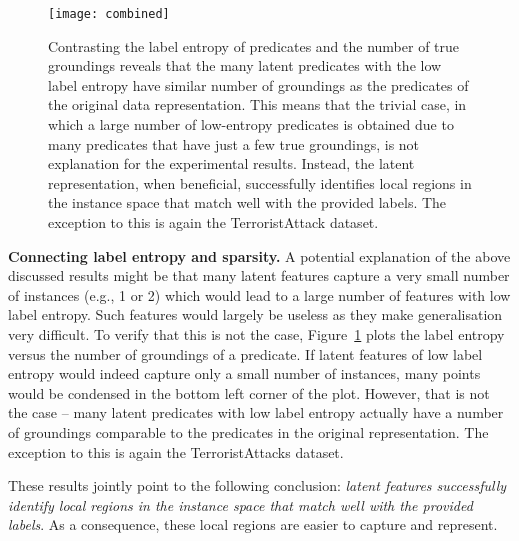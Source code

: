 \begin{figure}
	\centering
	\medskip
    \texttt{[image: combined]}
    \caption[Contrasting the label entropy and sparsity in latent representation created by \gls{curled}]{Contrasting the label entropy of predicates and the number of true groundings reveals that the many latent predicates with the low label entropy have similar number of groundings as the predicates of the original data representation. This means that the trivial case, in which a large number of low-entropy predicates is obtained due to many predicates that have just a few true groundings, is not explanation for the experimental results. Instead, the latent representation, when beneficial, successfully identifies local regions in the instance space that match well with the provided labels. The exception to this is again the TerroristAttack dataset.}
    \label{fig:EntropyVsSparsity}
\end{figure}




\textbf{Connecting label entropy and sparsity.}
A potential explanation of the above discussed results might be that many latent features capture a very small number of instances (e.g., 1 or 2) which would lead to a large number of features with low label entropy.
Such features would largely be useless as they make generalisation very difficult.
To verify that this is not the case, Figure~\ref{fig:EntropyVsSparsity} plots the label entropy versus the number of groundings of a predicate.
If latent features of low label entropy would indeed capture only a small number of instances, many points would be condensed in the bottom left corner of the plot.
However, that is not the case -- many latent predicates with low label entropy actually have a number of groundings comparable to the predicates in the original representation.
The exception to this is again the TerroristAttacks dataset.

These results jointly point to the following conclusion: \textit{latent features successfully identify local regions in the instance space that match well with the provided labels}.
As a consequence, these local regions are easier to capture and represent.









